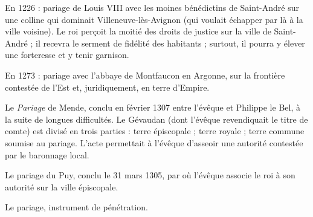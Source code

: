 \documentclass[french,twoside]{book} %
\begin{document}
En 1226 : pariage de Louis VIII avec les moines bénédictins de  
\label{p21} Saint-André sur une colline qui dominait Villeneuve-lès-Avignon (qui voulait échapper par là à la ville voisine). Le roi perçoit la moitié des droits de justice sur la ville de Saint-André ; il recevra le serment de fidélité des habitants ; surtout, il pourra y élever une forteresse et y tenir garnison.\par
En 1273 : pariage avec l’abbaye de Montfaucon en Argonne, sur la frontière contestée de l’Est et, juridiquement, en terre d’Empire.\par
Le \emph{Pariage} de Mende, conclu en février 1307 entre l’évêque et Philippe le Bel, à la suite de longues difficultés. Le Gévaudan (dont l’évêque revendiquait le titre de comte) est divisé en trois parties : terre épiscopale ; terre royale ; terre commune soumise au pariage. L’acte permettait à l’évêque d’asseoir une autorité contestée par le baronnage local.\par
Le pariage du Puy, conclu le 31 mars 1305, par où l’évêque associe le roi à son autorité sur la ville épiscopale.\par
Le pariage, instrument de pénétration.
\end{document}
